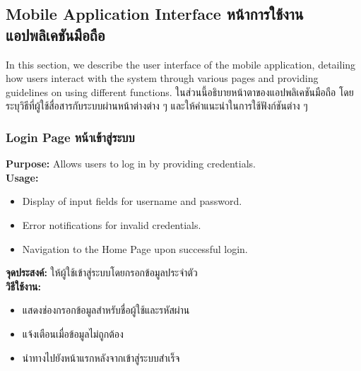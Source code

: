 \newcommand{\pageRecordDefault}{\insertPDFfigureManual[page=1,width=\horizontalScreenshotWidth][H]{resources/mobile-app/page-record-default.png}{\ifenglish Record Page before recording \else หน้าบันทึกวิดีโอก่อนการบันทึกวิดีโอ \fi}{page-record-default}} 

\newcommand{\pageRecordRecording}{\insertPDFfigureManual[page=1,width=\horizontalScreenshotWidth][H]{resources/mobile-app/page-record-recording.png}{\ifenglish Record Page during recording \else หน้าบันทึกวิดีโอขณะการบันทึกวิดีโอ \fi}{page-record-recording}} 

\newcommand{\pageRecordPause}{\insertPDFfigureManual[page=1,width=\horizontalScreenshotWidth][H]{resources/mobile-app/page-record-pause.png}{\ifenglish Record Page during pausing \else หน้าบันทึกวิดีโอขณะหยุดชั่วคราว \fi}{page-record-pause}} 

\newcommand{\pageInfoDefault}{\insertPDFfigureManual[page=1,width=\verticalScreenshotWidth][H]{resources/mobile-app/page-info-default.png}{\ifenglish Information Page \else ข้อมูลผู้ใช้ \fi}{page-info-default}} 

\subsection{\ifenglish Mobile Application Interface \else หน้าการใช้งานแอปพลิเคชันมือถือ \fi}
\ifenglish
In this section, we describe the user interface of the mobile application, detailing how users interact with the system through various pages and providing guidelines on using different functions.
\else
ในส่วนนี้อธิบายหน้าตาของแอปพลิเคชันมือถือ โดยระบุวิธีที่ผู้ใช้สื่อสารกับระบบผ่านหน้าต่างต่าง ๆ และให้คำแนะนำในการใช้ฟังก์ชันต่าง ๆ
\fi

\subsubsection{\ifenglish Login Page \else หน้าเข้าสู่ระบบ \fi}
\ifenglish
\textbf{Purpose:} Allows users to log in by providing credentials.\\
\textbf{Usage:} 
\begin{itemize}
    \item Display of input fields for username and password.
    \item Error notifications for invalid credentials.
    \item Navigation to the Home Page upon successful login.
\end{itemize}
\else
\textbf{จุดประสงค์:} ให้ผู้ใช้เข้าสู่ระบบโดยกรอกข้อมูลประจำตัว\\
\textbf{วิธีใช้งาน:} 
\begin{itemize}
    \item แสดงช่องกรอกข้อมูลสำหรับชื่อผู้ใช้และรหัสผ่าน
    \item แจ้งเตือนเมื่อข้อมูลไม่ถูกต้อง
    \item นำทางไปยังหน้าแรกหลังจากเข้าสู่ระบบสำเร็จ
\end{itemize}
\fi

